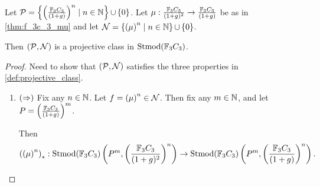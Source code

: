 


\begin{theorem}
    Let \( {\mathcal{P}} = \left\{ \left( \frac{{\mathbb{F}}_3C_3}{(1 + g)} \right)^n \mid n \in {\mathbb{N}} \right\} \mathop{\cup}\limits \left\{ 0 \right\} \). Let \( \mu: \frac{{\mathbb{F}}_3C_3}{(1 + g)^2} \to \frac{{\mathbb{F}}_3C_3}{(1 + g)} \) be as in \autoref{thm:f_3c_3_mu} and let \( {\mathcal{N}} = \left\{ \left( \mu \right)^n \mid n \in {\mathbb{N}} \right\} \mathop{\cup}\limits \left\{ 0 \right\} \).

    Then \( \left( {\mathcal{P}}, {\mathcal{N}}\right) \) is a projective class in \( \operatorname{Stmod}({\mathbb{F}}_3C_3) \).
\end{theorem}
\begin{proof}
    Need to show that \( \left( {\mathcal{P}}, {\mathcal{N}} \right) \) satisfies the three properties in \autoref{def:projective_class}.

    \begin{enumerate}
        \item {
            \( \left( \Rightarrow \right) \) Fix any \( n \in {\mathbb{N}} \). Let \( f = \left( \mu \right)^n \in {\mathcal{N}} \).
            Then fix any \( m \in {\mathbb{N}} \), and let \( P = \left( \frac{{\mathbb{F}}_3C_3}{(1 + g)} \right)^m \).

            Then 
            \[
                \left( \left( \mu \right)^n \right)_* : \operatorname{Stmod}({\mathbb{F}}_3C_3)\left(P^m, \left(\frac{{\mathbb{F}}_3C_3}{(1 + g)^2}\right)^n \right) \to \operatorname{Stmod}({\mathbb{F}}_3C_3)\left(P^m, \left(\frac{{\mathbb{F}}_3C_3}{(1 + g)}\right)^n \right).
            \]
            
        }
    \end{enumerate}
\end{proof}
